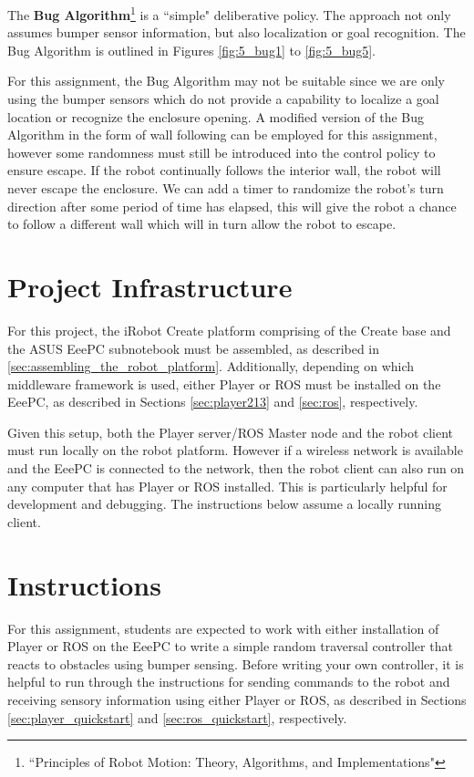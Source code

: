 The {\bf Bug Algorithm}\footnote{``Principles of Robot Motion: Theory, Algorithms, and Implementations"} is a ``simple" deliberative policy. The approach not only assumes bumper sensor information, but also localization or goal recognition. The Bug Algorithm is outlined in Figures \ref{fig:5_bug1} to \ref{fig:5_bug5}.

For this assignment, the Bug Algorithm may not be suitable since we are only using the bumper sensors which do not provide a capability to localize a goal location or recognize the enclosure opening. A modified version of the Bug Algorithm in the form of wall following can be employed for this assignment, however some randomness must still be introduced into the control policy to ensure escape. If the robot continually follows the interior wall, the robot will never escape the enclosure. We can add a timer to randomize the robot's turn direction after some period of time has elapsed, this will give the robot a chance to follow a different wall which will in turn allow the robot to escape.

\section{Project Infrastructure}

For this project, the iRobot Create platform comprising of the Create base and the ASUS EeePC subnotebook must be assembled, as described in \ref{sec:assembling_the_robot_platform}. Additionally, depending on which middleware framework is used, either Player or ROS must be installed on the EeePC, as described in Sections \ref{sec:player213} and \ref{sec:ros}, respectively.
 
Given this setup, both the Player server/ROS Master node and the robot client must run locally on the robot platform. However if a wireless network is available and the EeePC is connected to the network, then the robot client can also run on any computer that has Player or ROS installed. This is particularly helpful for development and debugging. The instructions below assume a locally running client.
 
\section{Instructions}

For this assignment, students are expected to work with either installation of Player or ROS on the EeePC to write a simple random traversal controller that reacts to obstacles using bumper sensing. Before writing your own controller, it is helpful to run through the instructions for sending commands to the robot and receiving sensory information using either Player or ROS, as described in Sections \ref{sec:player_quickstart} and \ref{sec:ros_quickstart}, respectively.

